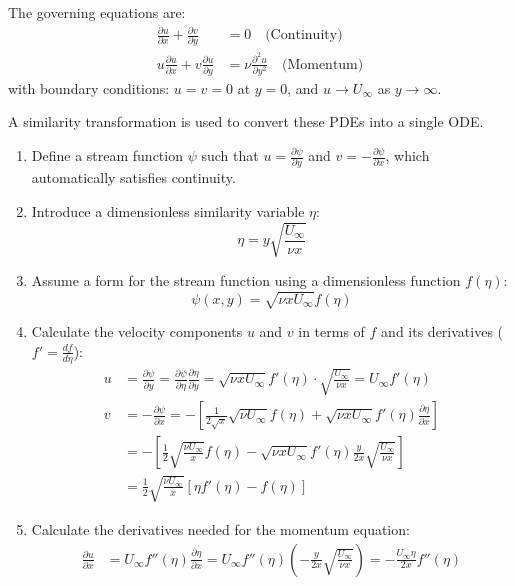 \documentclass{article}
\begin{document}
The governing equations are:
\begin{align}
    \frac{\partial u}{\partial x} + \frac{\partial v}{\partial y} &= 0 \quad \text{(Continuity)} \\
    u\frac{\partial u}{\partial x} + v\frac{\partial u}{\partial y} &= \nu \frac{\partial^2 u}{\partial y^2} \quad \text{(Momentum)}
\end{align}
with boundary conditions: $u=v=0$ at $y=0$, and $u \to U_\infty$ as $y \to \infty$.

A similarity transformation is used to convert these PDEs into a single ODE.
\begin{enumerate}
    \item Define a stream function $\psi$ such that $u = \frac{\partial \psi}{\partial y}$ and $v = -\frac{\partial \psi}{\partial x}$, which automatically satisfies continuity.
    \item Introduce a dimensionless similarity variable $\eta$:
    $$ \eta = y \sqrt{\frac{U_\infty}{\nu x}} $$
    \item Assume a form for the stream function using a dimensionless function $f(\eta)$:
    $$ \psi(x, y) = \sqrt{\nu x U_\infty} f(\eta) $$
    \item Calculate the velocity components $u$ and $v$ in terms of $f$ and its derivatives ($f' = \frac{df}{d\eta}$):
    \begin{align*}
        u &= \frac{\partial \psi}{\partial y} = \frac{\partial \psi}{\partial \eta}\frac{\partial \eta}{\partial y} = \sqrt{\nu x U_\infty} f'(\eta) \cdot \sqrt{\frac{U_\infty}{\nu x}} = U_\infty f'(\eta) \\
        v &= -\frac{\partial \psi}{\partial x} = -\left[ \frac{1}{2\sqrt{x}}\sqrt{\nu U_\infty} f(\eta) + \sqrt{\nu x U_\infty} f'(\eta) \frac{\partial \eta}{\partial x} \right] \\
          &= -\left[ \frac{1}{2}\sqrt{\frac{\nu U_\infty}{x}}f(\eta) - \sqrt{\nu x U_\infty} f'(\eta) \frac{y}{2x}\sqrt{\frac{U_\infty}{\nu x}} \right] \\
          &= \frac{1}{2}\sqrt{\frac{\nu U_\infty}{x}} \left[ \eta f'(\eta) - f(\eta) \right]
    \end{align*}
    \item Calculate the derivatives needed for the momentum equation:
    \begin{align*}
        \frac{\partial u}{\partial x} &= U_\infty f''(\eta) \frac{\partial \eta}{\partial x} = U_\infty f''(\eta) \left(-\frac{y}{2x}\sqrt{\frac{U_\infty}{\nu x}}\right) = - \frac{U_\infty \eta}{2x} f''(\eta) \\

\end{align*}
\end{enumerate}
\end{document}

